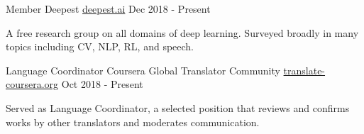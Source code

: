 

\begin{cventries}

  \cventry
    {Member} %
    {Deepest} %
    {\url{deepest.ai}} %
    {Dec 2018 - Present} %
    {
      \begin{cvitems} %
        \item {A free research group on all domains of deep learning. Surveyed broadly in many topics including CV, NLP, RL, and speech.}
      \end{cvitems}
    }

  \cventry
    {Language Coordinator} %
    {Coursera Global Translator Community} %
    {\url{translate-coursera.org}} %
    {Oct 2018 - Present} %
    {
      \begin{cvitems} %
        \item {Served as Language Coordinator, a selected position that reviews and confirms works by other translators and moderates communication.}
      \end{cvitems}
    }

\end{cventries}
